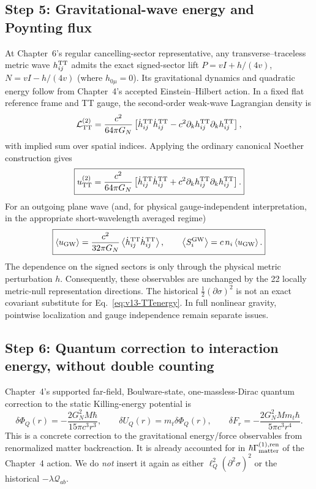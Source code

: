 \documentclass[11pt,a4paper]{article}
\theoremstyle{definition}\newtheorem{definition}[theorem]{Definition}
\theoremstyle{remark}\newtheorem{remark}[theorem]{Remark}
\begin{document}
\subsection{Step 5: Gravitational-wave energy and Poynting flux}
\label{sec:v13-wave}
At Chapter~6's regular cancelling-sector representative, any
transverse--traceless metric wave $h_{ij}^{\rm TT}$ admits the
exact signed-sector lift $P=vI+h/(4v)$,
$N=vI-h/(4v)$ (where $h_{0\mu}=0$).  Its gravitational dynamics
and quadratic energy follow from Chapter~4's accepted
Einstein--Hilbert action.  In a fixed flat reference frame and TT gauge,
the second-order weak-wave Lagrangian density is
\begin{equation}\label{eq:v13-LTT}
\mathcal L_{\rm TT}^{(2)}
=\frac{c^2}{64\pi G_N}
\left[\dot h_{ij}^{\rm TT}\dot h_{ij}^{\rm TT}
-c^2\partial_kh_{ij}^{\rm TT}\partial_kh_{ij}^{\rm TT}\right],
\end{equation}
with implied sum over spatial indices.  Applying the ordinary
canonical Noether construction gives
\begin{equation}\label{eq:v13-TTenergy}
\boxed{u_{\rm TT}^{(2)}=\frac{c^2}{64\pi G_N}
\left[\dot h_{ij}^{\rm TT}\dot h_{ij}^{\rm TT}
+c^2\partial_k h_{ij}^{\rm TT}\partial_k h_{ij}^{\rm TT}\right].}
\end{equation}
For an outgoing plane wave (and, for physical gauge-independent
interpretation, in the appropriate short-wavelength averaged regime)
\begin{equation}\label{eq:v13-waveflux}
\boxed{\left\langle u_{\rm GW}\right\rangle
=\frac{c^2}{32\pi G_N}\left\langle\dot h_{ij}^{\rm TT}
\dot h_{ij}^{\rm TT}\right\rangle,
\qquad \left\langle S_i^{\rm GW}\right\rangle
=c\,n_i\left\langle u_{\rm GW}\right\rangle.}
\end{equation}
The dependence on the signed sectors is only through the physical
metric perturbation $h$.  Consequently, these observables are unchanged
by the 22 locally metric-null representation directions.  The
historical $\frac12(\partial\sigma)^2$ is not an exact covariant
substitute for Eq.~\eqref{eq:v13-TTenergy}.  In full nonlinear gravity,
pointwise localization and gauge independence remain separate issues.

\subsection{Step 6: Quantum correction to interaction energy, without double counting}
\label{sec:v13-quantum}
Chapter~4's supported far-field, Boulware-state, one-massless-Dirac
quantum correction to the static Killing-energy potential is
\begin{equation}\label{eq:v13-quantum}
\boxed{\delta\Phi_Q(r)=-\frac{2G_N^2M\hbar}{15\pi c^3r^3},
\qquad \delta U_Q(r)=m_t\delta\Phi_Q(r),
\qquad \delta F_r=-\frac{2G_N^2Mm_t\hbar}{5\pi c^3r^4}.}
\end{equation}
This is a concrete correction to the gravitational energy/force
observables from renormalized matter backreaction.  It is already
accounted for in $\hbar\Gamma_{\rm matter}^{(1),\rm ren}$ of the
Chapter~4 action.  We do \emph{not} insert it again as either
$\ell_Q^2(\partial^2\sigma)^2$ or the historical
$-\lambda\mathcal Q_{ab}$.
\end{document}

